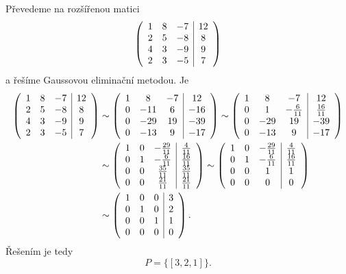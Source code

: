 \begin{reseni}
Převedeme na rozšířenou matici
$$
\left (
\begin{array}{c c c | c }
1 & 8& -7& 12\\
2& 5& -8& 8\\
4& 3& -9& 9\\
2& 3& -5& 7
\end{array}
\right )
$$
a řešíme Gaussovou eliminační metodou. Je
\begin{align*}
\left (
\begin{array}{c c c | c }
1 & 8& -7& 12\\
2& 5& -8& 8\\
4& 3& -9& 9\\
2& 3& -5& 7
\end{array}
\right )&\sim
\left (
\begin{array}{c c c | c }
	1 & 8& -7& 12\\
	0& -11& 6& -16\\
	0& -29& 19& -39\\
	0& -13& 9& -17
\end{array}
\right )\sim
\left (
\begin{array}{c c c | c }
	1 & 8& -7& 12\\
	0& 1& -\frac{6}{11}& \frac{16}{11}\\
	0& -29& 19& -39\\
	0& -13& 9& -17
\end{array}
\right )\\
&\sim
\left (
\begin{array}{c c c | c }
	1 & 0& -\frac{29}{11}& \frac{4}{11}\\
	0& 1& -\frac{6}{11}& \frac{16}{11}\\
	0& 0& \frac{35}{11}& \frac{35}{11}\\
	0& 0& \frac{21}{11}& \frac{21}{11}
\end{array}
\right )
\sim\left (
\begin{array}{c c c | c }
	1 & 0& -\frac{29}{11}& \frac{4}{11}\\
	0& 1& -\frac{6}{11}& \frac{16}{11}\\
	0& 0& 1& 1\\
	0& 0& 0& 0
\end{array}
\right )\\
&\sim
\left (
\begin{array}{c c c | c }
	1 & 0& 0& 3\\
	0& 1& 0& 2\\
	0& 0& 1& 1\\
	0& 0& 0& 0
\end{array}
\right ).
\end{align*}
Řešením je tedy
$$P=\{[3, 2, 1]\}.$$
\end{reseni}

